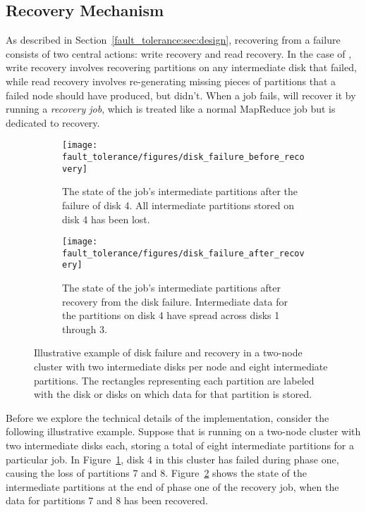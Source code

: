 \subsection{Recovery Mechanism}
\label{sec:recovery}

As described in Section~\ref{fault_tolerance:sec:design}, recovering from a
failure consists of two central actions: write recovery and read recovery. In
the case of \themis, write recovery involves recovering partitions on any
intermediate disk that failed, while read recovery involves re-generating
missing pieces of partitions that a failed node should have produced, but
didn't. When a job fails, \themis will recover it by running a \emph{recovery
  job}, which is treated like a normal MapReduce job but is dedicated to
recovery.

\begin{figure}
  \centering
  \begin{subfigure}[t]{\columnwidth}
    \centering
    \texttt{[image: fault\_tolerance/figures/disk\_failure\_before\_recovery]}
    \caption{\label{fig:disk_fail_before} The state of the job's intermediate
      partitions after the failure of disk 4. All intermediate partitions
      stored on disk 4 has been lost.}
  \end{subfigure}\hspace{0.05\textwidth}
  \begin{subfigure}[t]{\columnwidth}
    \centering
    \texttt{[image: fault\_tolerance/figures/disk\_failure\_after\_recovery]}
    \caption{\label{fig:disk_fail_after} The state of the job's intermediate
      partitions after recovery from the disk failure. Intermediate data for
      the partitions on disk 4 have spread across disks 1 through 3.}
  \end{subfigure}
  \caption{\label{fig:disk_fail} Illustrative example of disk failure and
    recovery in a two-node cluster with two intermediate disks per node and
    eight intermediate partitions. The rectangles
    representing each partition are labeled with the disk or disks on which
    data for that partition is stored.}
\end{figure}

Before we explore the technical details of the implementation, consider the
following illustrative example. Suppose that \themis is running on a two-node
cluster with two intermediate disks each, storing a total of eight intermediate
partitions for a particular job. In Figure~\ref{fig:disk_fail_before}, disk 4
in this cluster has failed during phase one, causing the loss of partitions 7
and 8. Figure~\ref{fig:disk_fail_after} shows the state of the intermediate
partitions at the end of phase one of the recovery job, when the data for
partitions 7 and 8 has been recovered.

